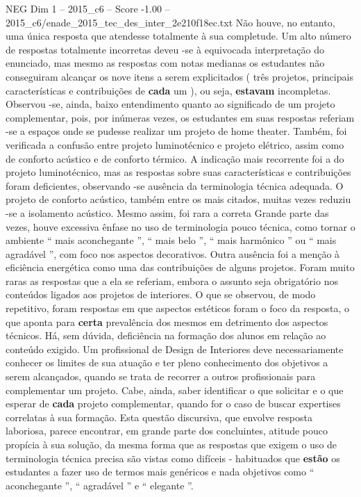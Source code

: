 \begin{textsample}{NEG Dim 1 – 2015\_c6 – Score -1.00 – 2015\_c6/enade\_2015\_tec\_des\_inter\_2e210f18ec.txt}
Não houve, no entanto, uma única resposta que atendesse totalmente à sua completude.
Um alto número de respostas totalmente incorretas deveu -se à equivocada interpretação do enunciado, mas mesmo as respostas com notas medianas os estudantes não conseguiram alcançar os nove itens a serem explicitados ( três projetos, principais características e contribuições de \textbf{cada} um ), ou seja, \textbf{estavam} incompletas.
Observou -se, ainda, baixo entendimento quanto ao significado de um projeto complementar, pois, por inúmeras vezes, os estudantes em suas respostas referiam -se a espaços onde se pudesse realizar um projeto de home theater.
Também, foi verificada a confusão entre projeto luminotécnico e projeto elétrico, assim como de conforto acústico e de conforto térmico.
A indicação mais recorrente foi a do projeto luminotécnico, mas as respostas sobre suas características e contribuições foram deficientes, observando -se ausência da terminologia técnica adequada.
O projeto de conforto acústico, também entre os mais citados, muitas vezes reduziu -se a isolamento acústico.
Mesmo assim, foi rara a correta Grande parte das vezes, houve excessiva ênfase no uso de terminologia pouco técnica, como tornar o ambiente “ mais aconchegante ”, “ mais belo ”, “ mais harmônico ” ou “ mais agradável ”, com foco nos aspectos decorativos.
Outra ausência foi a menção à eficiência energética como uma das contribuições de alguns projetos.
Foram muito raras as respostas que a ela se referiam, embora o assunto seja obrigatório nos conteúdos ligados aos projetos de interiores.
O que se observou, de modo repetitivo, foram respostas em que aspectos estéticos foram o foco da resposta, o que aponta para \textbf{certa} prevalência dos mesmos em detrimento dos aspectos técnicos.
Há, sem dúvida, deficiência na formação dos alunos em relação ao conteúdo exigido.
Um profissional de Design de Interiores deve necessariamente conhecer os limites de sua atuação e ter pleno conhecimento dos objetivos a serem alcançados, quando se trata de recorrer a outros profissionais para complementar um projeto.
Cabe, ainda, saber identificar o que solicitar e o que esperar de \textbf{cada} projeto complementar, quando for o caso de buscar expertises correlatas à sua formação.
Esta questão discursiva, que envolve resposta laboriosa, parece encontrar, em grande parte dos concluintes, atitude pouco propícia à sua solução, da mesma forma que as respostas que exigem o uso de terminologia técnica precisa são vistas como difíceis - habituados que \textbf{estão} os estudantes a fazer uso de termos mais genéricos e nada objetivos como “ aconchegante ”, “ agradável ” e “ elegante ”.

\end{textsample}
